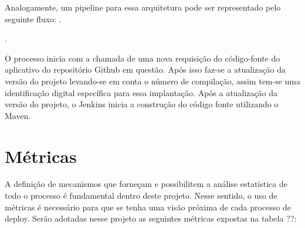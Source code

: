 Analogamente, um pipeline para essa arquitetura pode ser representado pelo seguinte fluxo:
.

.


O processo inicia com a chamada de uma nova requisição do código-fonte do aplicativo do repositório Github em questão. Após isso faz-se a atualização da versão do projeto levando-se em conta o número de compilação, assim tem-se uma identificação digital específica para essa implantação. Após a atualização da versão do projeto, o Jenkins inicia a construção do código fonte utilizando o Maven.

\section{Métricas}

A definição de mecanismos que forneçam e possibilitem a análise estatística de todo o processo é fundamental dentro deste projeto. Nesse sentido, o uso de métricas é necessário para que se tenha uma visão próxima de cada processo de deploy. Serão adotadas nesse projeto as seguintes métricas expostas na tabela ??:


